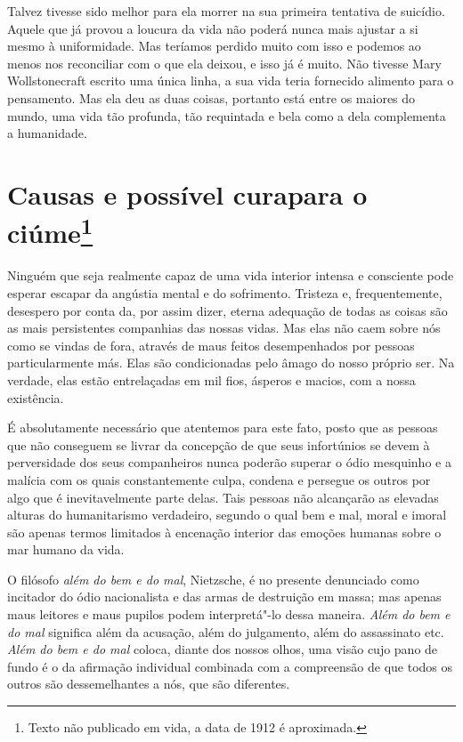 Talvez tivesse sido melhor para ela morrer na sua primeira tentativa
de suicídio. Aquele que já provou a loucura da vida não poderá nunca mais
ajustar a si mesmo à uniformidade. Mas teríamos perdido muito com isso e
podemos ao menos nos reconciliar com o que ela deixou, e isso já é
muito. Não tivesse Mary Wollstonecraft escrito uma única linha, a sua
vida teria fornecido alimento para o pensamento. Mas ela deu as duas
coisas, portanto está entre os maiores do mundo, uma vida tão profunda,
tão requintada e bela como a dela complementa a humanidade.

\chapter[Causas e possível cura para o ciúme]{Causas e possível cura\break para o ciúme\footnote{Texto não publicado em vida, a data de 1912 é aproximada.}}

Ninguém que seja realmente capaz de uma vida interior intensa e
consciente pode esperar escapar da angústia mental e do sofrimento.
Tristeza e, frequentemente, desespero por conta da, por assim dizer, eterna
adequação de todas as coisas são as mais persistentes companhias das
nossas vidas. Mas elas não caem sobre nós como se vindas de fora,
através de maus feitos desempenhados por pessoas particularmente más.
Elas são condicionadas pelo âmago do nosso próprio ser. Na verdade, elas
estão entrelaçadas em mil fios, ásperos e macios, com a nossa
existência.

É absolutamente necessário que atentemos para este fato, posto que as
pessoas que não conseguem se livrar da concepção de que seus infortúnios
se devem à perversidade dos seus companheiros nunca poderão superar o
ódio mesquinho e a malícia com os quais constantemente culpa, condena e
persegue os outros por algo que é inevitavelmente parte delas. Tais
pessoas não alcançarão as elevadas alturas do humanitarismo verdadeiro,
segundo o qual bem e mal, moral e imoral são apenas termos limitados à
encenação interior das emoções humanas sobre o mar humano da vida.

O filósofo \textit{além do bem e do mal}, Nietzsche, é no presente denunciado
como incitador do ódio nacionalista e das armas de destruição em massa;
mas apenas maus leitores e maus pupilos podem interpretá"-lo dessa
maneira. \textit{Além do bem e do mal} significa além da acusação, além do
julgamento, além do assassinato etc. \textit{Além do bem e do mal} coloca, diante dos nossos olhos, uma visão cujo pano de fundo é o da afirmação
individual combinada com a compreensão de que todos os outros são
dessemelhantes a nós, que são diferentes.

